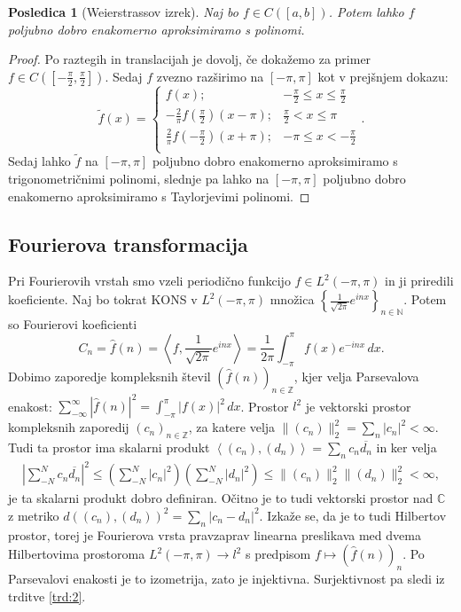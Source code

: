 \documentclass[10pt, a4paper]{article}
\newtheorem{posledica}[izr]{Posledica}
\newenvironment{noticeC}{%
  \tcolorbox[%
  notitle,
  empty,
  enhanced,  %
  breakable,
  coltext=black, 
  fontupper=\rmfamily,
  parbox=false,
  noparskip,
  sharp corners,
  boxrule=-1pt,  %
  frame hidden,
  left=7pt,  %
  right=7pt,
  top=5pt,
  bottom=5pt,
  before skip=2.5ex plus 2pt,
  after skip=2.5ex plus 2pt,
  overlay unbroken and last={%
  },
  ]}
{\endtcolorbox}
\newenvironment{dokaz}%
  {\begin{noticeC}\begin{proof}}%
  {\end{proof}\end{noticeC}}
\newcommand{\N}{\mathbb {N}}
\newcommand{\Z}{\mathbb {Z}}
\newcommand{\C}{\mathbb {C}}
\newcommand{\sprod}[2]{\left\langle {#1},{#2} \right\rangle}
\begin{document}
\begin{posledica}[Weierstrassov izrek]
    Naj bo $f \in C([a, b])$. Potem lahko $f$ poljubno dobro enakomerno aproksimiramo s polinomi.
\end{posledica}

\begin{dokaz}
    Po raztegih in translacijah je dovolj, če dokažemo za primer $f \in C(\left[-\frac{\pi}{2}, \frac{\pi}{2}\right])$.
    Sedaj $f$ zvezno razširimo na $[-\pi, \pi]$ kot v prejšnjem dokazu:
    $$\widetilde{f} (x) = \begin{cases}
        f(x); & -\frac{\pi}{2} \leq x \leq \frac{\pi}{2}\\
    -\frac{2}{\pi}f\left(\frac{\pi}{2}\right) (x - \pi); & \frac{\pi}{2} < x \leq \pi\\
    \frac{2}{\pi}f\left(-\frac{\pi}{2}\right) (x + \pi); & -\pi \leq x < -\frac{\pi}{2}\\
    \end{cases}.$$
    Sedaj lahko $\widetilde{f}$ na $[-\pi, \pi]$ poljubno dobro enakomerno aproksimiramo s trigonometričnimi polinomi, slednje 
    pa lahko na $[-\pi, \pi]$ poljubno dobro enakomerno aproksimiramo s Taylorjevimi polinomi. 
\end{dokaz}

\subsection{Fourierova transformacija}

Pri Fourierovih vrstah smo vzeli periodično funkcijo $f \in L^2 (-\pi, \pi)$
in ji priredili koeficiente.
Naj bo tokrat KONS v $L^2 (-\pi, \pi)$ množica $\left\lbrace\frac{1}{\sqrt{2\pi}} e^{inx}\right\rbrace_{n \in \N}$.
Potem so Fourierovi koeficienti 
$$C_n = \hat{f} (n) = \sprod{f}{\frac{1}{\sqrt{2\pi}} e^{inx}} = \frac{1}{2\pi} \int_{-\pi} ^\pi f(x) e^{-inx}\, dx.$$
Dobimo zaporedje kompleksnih števil $\left(\hat{f} (n)\right)_{n \in \Z}$, 
kjer velja Parsevalova enakost:
$\sum_{-\infty} ^\infty |\hat{f} (n)|^2 = \int_{-\pi} ^\pi |f(x)|^2\, dx$.
Prostor $l^2$ je vektorski prostor kompleksnih zaporedij $(c_n)_{n \in \Z}$,
za katere velja $\|(c_n)\|_2 ^2 = \sum_n |c_n|^2 < \infty$.
Tudi ta prostor ima skalarni produkt $\sprod{(c_n)}{(d_n)} = \sum_n c_n \overline{d_n}$ 
in ker velja
\begin{align*}
    \left| \sum_{-N} ^N c_n \overline{d_n} \right|^2 \leq \left(\sum_{-N} ^N |c_n|^2\right) \left(\sum_{-N} ^N |d_n|^2\right) \leq \| (c_n)\|_2 ^2 \| (d_n) \|_2 ^2 < \infty,
\end{align*}
je ta skalarni produkt dobro definiran. Očitno je to tudi vektorski prostor nad $\C$ 
z metriko $d((c_n), (d_n))^2 = \sum_n |c_n - d_n|^2$.
Izkaže se, da je to tudi Hilbertov prostor, torej je Fourierova vrsta pravzaprav linearna preslikava 
med dvema Hilbertovima prostoroma $L^2 (-\pi, \pi) \to l^2$ s predpisom $f \mapsto (\hat{f}(n))_n$.
Po Parsevalovi enakosti je to izometrija, zato je injektivna. Surjektivnost pa sledi iz trditve \ref{trd:2}.
\end{document}
